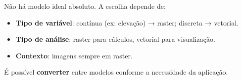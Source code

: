 Não há modelo ideal absoluto. A escolha depende de:

\begin{itemize}
\item \textbf{Tipo de variável}: contínua (ex: elevação) → raster; discreta → vetorial.
\item \textbf{Tipo de análise}: raster para cálculos, vetorial para visualização.
\item \textbf{Contexto}: imagens sempre em raster.
\end{itemize}

É possível \textbf{converter} entre modelos conforme a necessidade da aplicação.

\pagestyle{empty}
